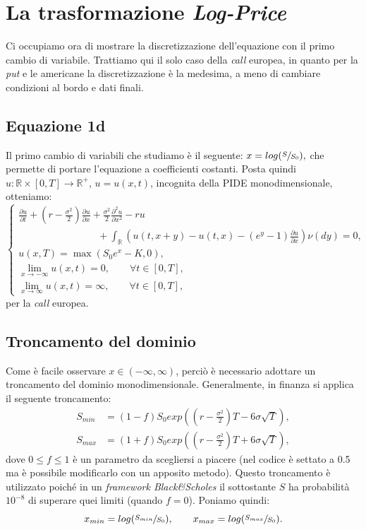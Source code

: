 \documentclass[a4paper,10pt]{report}
\newcommand{\der}[2]{\frac{\partial #1}{\partial #2}}
\newcommand{\dder}[2]{\frac{\partial^2 #1}{\partial #2^2}}
\theoremstyle{plain}
\theoremstyle{definition}
\theoremstyle{remark}
\begin{document}
\section{La trasformazione \emph{Log-Price}}
Ci occupiamo ora di mostrare la discretizzazione dell'equazione con il primo cambio di variabile. Trattiamo qui il solo caso della \emph{call} europea, in quanto per la \emph{put} e le americane la discretizzazione \`e la medesima, a meno di cambiare condizioni al bordo e dati finali.
\subsection{Equazione 1d}
Il primo cambio di variabili che studiamo \`e il seguente: $x=log(\sfrac{S}{S_0}),$ che permette di portare l'equazione a coefficienti costanti. Posta quindi $u: \mathbb{R}\times[0,T]\rightarrow\mathbb{R}^+$, $u=u(x,t)$, incognita della PIDE monodimensionale, otteniamo:
\begin{equation}
\label{eq:pide1dlog}
\begin{cases}
\displaystyle
\der{u}{t}+\left(r-\frac{\sigma^2}{2}\right)\der{u}{x}+\frac{\sigma^2}{2}\dder{u}{x}-ru\\
\displaystyle
\qquad\qquad\qquad\qquad+\int_\mathbb{R}\left( u(t,x+y)-u(t,x)-(e^y-1)\der{u}{x}\right)\nu(dy)=0,\\
u(x,T)=\max(S_0e^x-K,0),\\
\lim\limits_{x\to-\infty}u(x,t)=0,\qquad\forall t\in[0,T],\\
\lim\limits_{x\to\infty}u(x,t)=\infty,\qquad\forall t\in[0,T],
\end{cases}
\end{equation}
per la \emph{call} europea.
\subsection{Troncamento del dominio}
Come \`e facile osservare $x\in(-\infty,\infty)$, perci\`o \`e necessario adottare un troncamento del dominio monodimensionale. Generalmente, in finanza si applica il seguente troncamento:
\begin{align}
\label{cut}
S_{min}&=(1-f)S_0exp\left( \left(r-\frac{\sigma^2}{2}\right)T-6\sigma\sqrt{T}\right),\\
S_{max}&=(1+f)S_0exp\left( \left(r-\frac{\sigma^2}{2}\right)T+6\sigma\sqrt{T}\right), \nonumber
\end{align}
dove $0\leq f\leq1$ \`e un parametro da scegliersi a piacere (nel codice \`e settato a 0.5 ma \`e possibile modificarlo con un apposito metodo). Questo troncamento \`e utilizzato poich\'e in un \emph{framework Black\&Scholes} il sottostante $S$ ha probabilit\`a $10^{-8}$ di superare quei limiti (quando $f=0$). Poniamo quindi: $$x_{min}=log(\sfrac{S_{min}}{S_0}), \qquad x_{max}=log(\sfrac{S_{max}}{S_0}).$$
\end{document}
